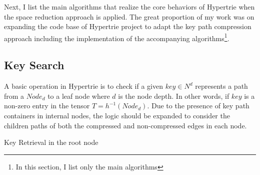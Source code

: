 Next, I list the main algorithms that realize the core behaviors of Hypertrie when the space reduction approach is applied. The great proportion of my work was on expanding the code base of Hypertrie project to adapt the key path compression approach including the implementation of the accompanying algorithms\footnote{In this section, I list only the main algorithms}.

\subsection{Key Search}
A basic operation in Hypertrie is to check if a given $key \in N^d$ represents a path from a $Node_{d}$ to a leaf node where $d$ is the node depth. In other words, if $key$ is a non-zero entry in the tensor $T = h^{-1} (Node_{d})$. Due to the presence of key path containers in internal nodes, the logic should be expanded to consider the children paths of both the compressed and non-compressed edges in each node. \\

\begin{algorithm}
	\DontPrintSemicolon
	\SetAlgoLined
     \;
\caption{\sc Key Retrieval in the root node}
\label{algo:key_retrieval_depth3}

\end{algorithm}


